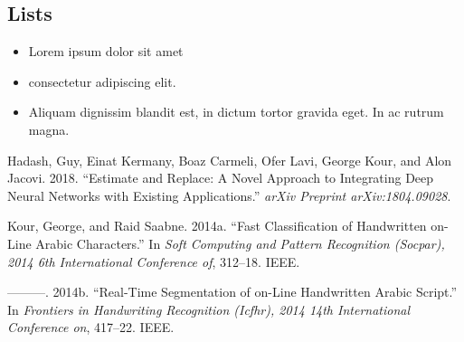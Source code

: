 \documentclass{article}
\begin{document}
\hypertarget{lists}{%
\subsection{Lists}\label{lists}}

\begin{itemize}
\tightlist
\item
  Lorem ipsum dolor sit amet
\item
  consectetur adipiscing elit.
\item
  Aliquam dignissim blandit est, in dictum tortor gravida eget. In ac
  rutrum magna.
\end{itemize}

\hypertarget{refs}{}
\leavevmode\hypertarget{ref-hadash2018estimate}{}%
Hadash, Guy, Einat Kermany, Boaz Carmeli, Ofer Lavi, George Kour, and
Alon Jacovi. 2018. ``Estimate and Replace: A Novel Approach to
Integrating Deep Neural Networks with Existing Applications.''
\emph{arXiv Preprint arXiv:1804.09028}.

\leavevmode\hypertarget{ref-kour2014fast}{}%
Kour, George, and Raid Saabne. 2014a. ``Fast Classification of
Handwritten on-Line Arabic Characters.'' In \emph{Soft Computing and
Pattern Recognition (Socpar), 2014 6th International Conference of},
312--18. IEEE.

\leavevmode\hypertarget{ref-kour2014real}{}%
---------. 2014b. ``Real-Time Segmentation of on-Line Handwritten Arabic
Script.'' In \emph{Frontiers in Handwriting Recognition (Icfhr), 2014
14th International Conference on}, 417--22. IEEE.



\end{document}
